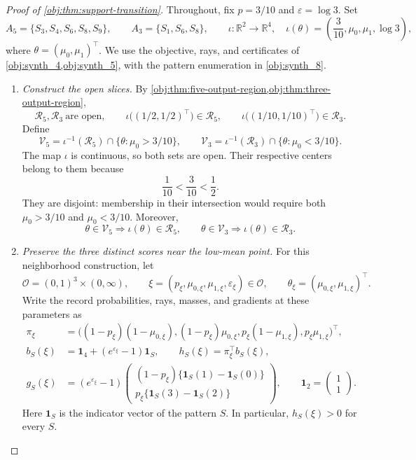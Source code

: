 \begin{proof}[Proof of \cref{obj:thm:support-transition}]
Throughout, fix \(p=3/10\) and \(\varepsilon=\log 3\). Set
\[
A_5=\{S_3,S_4,S_6,S_8,S_9\},
\qquad
A_3=\{S_1,S_6,S_8\},
\qquad
\iota:\mathbb R^2\longrightarrow\mathbb R^4,
\quad
\iota(\theta)=\left(\frac3{10},\mu_0,\mu_1,\log 3\right),
\]
where \(\theta=(\mu_0,\mu_1)^\top\). We use the objective, rays, and certificates of
\cref{obj:synth_4,obj:synth_5}, with the pattern enumeration in
\cref{obj:synth_8}.

\begin{enumerate}
\item \emph{Construct the open slices.}
By \cref{obj:thm:five-output-region,obj:thm:three-output-region},
\[
\mathcal R_5,\mathcal R_3\ \text{are open},\qquad
\iota\bigl((1/2,1/2)^\top\bigr)\in\mathcal R_5,
\qquad
\iota\bigl((1/10,1/10)^\top\bigr)\in\mathcal R_3.
\]
Define
\[
\mathcal V_5
=\iota^{-1}(\mathcal R_5)\cap\{\theta:\mu_0>3/10\},
\qquad
\mathcal V_3
=\iota^{-1}(\mathcal R_3)\cap\{\theta:\mu_0<3/10\}.
\]
The map \(\iota\) is continuous, so both sets are open. Their respective centers belong to them because
\[
\frac1{10}<\frac3{10}<\frac12.
\]
They are disjoint: membership in their intersection would require both
\(\mu_0>3/10\) and \(\mu_0<3/10\). Moreover,
\[
\theta\in\mathcal V_5\Longrightarrow\iota(\theta)\in\mathcal R_5,
\qquad
\theta\in\mathcal V_3\Longrightarrow\iota(\theta)\in\mathcal R_3.
\]

\item \emph{Preserve the three distinct scores near the low-mean point.}
For this neighborhood construction, let
\[
\mathcal O=(0,1)^3\times(0,\infty),\qquad
\xi=(p_\xi,\mu_{0,\xi},\mu_{1,\xi},\varepsilon_\xi)\in\mathcal O,
\qquad
\theta_\xi=(\mu_{0,\xi},\mu_{1,\xi})^\top.
\]
Write the record probabilities, rays, masses, and gradients at these parameters as
\[
\begin{aligned}
\pi_\xi&=\bigl((1-p_\xi)(1-\mu_{0,\xi}),
 (1-p_\xi)\mu_{0,\xi},
 p_\xi(1-\mu_{1,\xi}),p_\xi\mu_{1,\xi}\bigr)^\top,\\
b_S(\xi)&=\mathbf1_4+(e^{\varepsilon_\xi}-1)\mathbf1_S,
\qquad h_S(\xi)=\pi_\xi^\top b_S(\xi),\\
g_S(\xi)&=(e^{\varepsilon_\xi}-1)
\begin{pmatrix}
(1-p_\xi)\{\mathbf1_S(1)-\mathbf1_S(0)\}\\
p_\xi\{\mathbf1_S(3)-\mathbf1_S(2)\}
\end{pmatrix},
\qquad
\mathbf1_2=\begin{pmatrix}1\\1\end{pmatrix}.
\end{aligned}
\]
Here \(\mathbf1_S\) is the indicator vector of the pattern \(S\). In particular,
\(h_S(\xi)>0\) for every \(S\).


\end{enumerate}
\end{proof}
